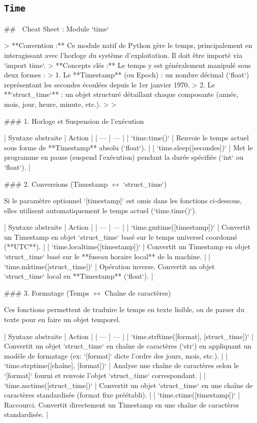 \subsection{\texttt{Time}}

## 🐍 Cheat Sheet : Module `time`

> **Convention :** Ce module natif de Python gère le temps, principalement en interagissant avec l'horloge du système d'exploitation. Il doit être importé via `import time`.
> **Concepts clés :** Le temps y est généralement manipulé sous deux formes :
> 1. Le **Timestamp** (ou Epoch) : un nombre décimal (`float`) représentant les secondes écoulées depuis le 1er janvier 1970.
> 2. Le **`struct_time`** : un objet structuré détaillant chaque composante (année, mois, jour, heure, minute, etc.).
> 
> 

### 1. Horloge et Suspension de l'exécution

| Syntaxe abstraite | Action |
| --- | --- |
| `time.time()` | Renvoie le temps actuel sous forme de **Timestamp** absolu (`float`). |
| `time.sleep([secondes])` | Met le programme en pause (suspend l'exécution) pendant la durée spécifiée (`int` ou `float`). |

### 2. Conversions (Timestamp $\leftrightarrow$ `struct_time`)

Si le paramètre optionnel `[timestamp]` est omis dans les fonctions ci-dessous, elles utilisent automatiquement le temps actuel (`time.time()`).

| Syntaxe abstraite | Action |
| --- | --- |
| `time.gmtime([timestamp])` | Convertit un Timestamp en objet `struct_time` basé sur le temps universel coordonné (**UTC**). |
| `time.localtime([timestamp])` | Convertit un Timestamp en objet `struct_time` basé sur le **fuseau horaire local** de la machine. |
| `time.mktime([struct_time])` | Opération inverse. Convertit un objet `struct_time` local en **Timestamp** (`float`). |

### 3. Formatage (Temps $\leftrightarrow$ Chaîne de caractères)

Ces fonctions permettent de traduire le temps en texte lisible, ou de parser du texte pour en faire un objet temporel.

| Syntaxe abstraite | Action |
| --- | --- |
| `time.strftime([format], [struct_time])` | Convertit un objet `struct_time` en chaîne de caractères (`str`) en appliquant un modèle de formatage (ex: `[format]` dicte l'ordre des jours, mois, etc.). |
| `time.strptime([chaîne], [format])` | Analyse une chaîne de caractères selon le `[format]` fourni et renvoie l'objet `struct_time` correspondant. |
| `time.asctime([struct_time])` | Convertit un objet `struct_time` en une chaîne de caractères standardisée (format fixe préétabli). |
| `time.ctime([timestamp])` | Raccourci. Convertit directement un Timestamp en une chaîne de caractères standardisée. |

